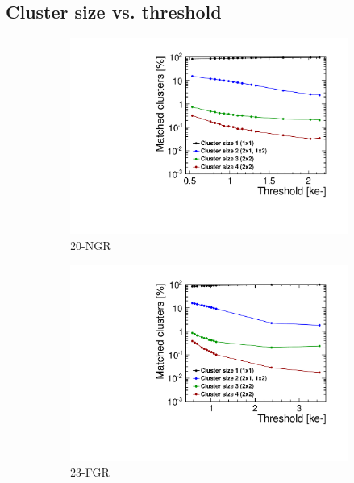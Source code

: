 \subsection{Cluster size vs. threshold}
\begin{figure}[htbp] \centering
  \begin{subfigure}[b]{0.33\textwidth}
    \includegraphics[width=\textwidth]{./figures/TestBeam/cluSize_THLscan_W0019_G07.pdf}
    \caption{20-NGR}
  \end{subfigure} \hfill
  \begin{subfigure}[b]{0.33\textwidth}
    \includegraphics[width=\textwidth]{./figures/TestBeam/cluSize_THLscan_W0019_F07.pdf}
    \caption{23-FGR}
  \end{subfigure}\hfill
  \begin{subfigure}[b]{0.33\textwidth}

\end{subfigure}
\end{figure}
